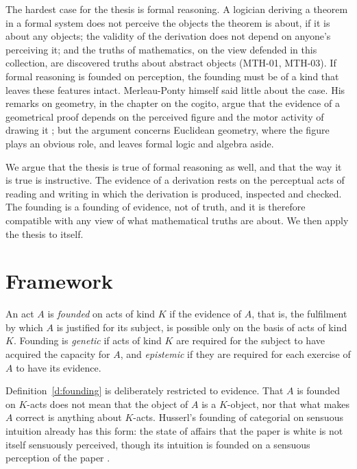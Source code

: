\documentclass{situationist-preprint}
\begin{document}
The hardest case for the thesis is formal reasoning. A logician deriving a theorem in a formal system does not perceive the objects the theorem is about, if it is about any objects; the validity of the derivation does not depend on anyone's perceiving it; and the truths of mathematics, on the view defended in this collection, are discovered truths about abstract objects (MTH-01, MTH-03). If formal reasoning is founded on perception, the founding must be of a kind that leaves these features intact. Merleau-Ponty himself said little about the case. His remarks on geometry, in the chapter on the cogito, argue that the evidence of a geometrical proof depends on the perceived figure and the motor activity of drawing it \citep[III.1]{MerleauPonty1945}; but the argument concerns Euclidean geometry, where the figure plays an obvious role, and leaves formal logic and algebra aside.

We argue that the thesis is true of formal reasoning as well, and that the way it is true is instructive. The evidence of a derivation rests on the perceptual acts of reading and writing in which the derivation is produced, inspected and checked. The founding is a founding of evidence, not of truth, and it is therefore compatible with any view of what mathematical truths are about. We then apply the thesis to itself.

\section{Framework}

\begin{definition}\label{d:founding}
An act $A$ is \emph{founded} on acts of kind $K$ if the evidence of $A$, that is, the fulfilment by which $A$ is justified for its subject, is possible only on the basis of acts of kind $K$. Founding is \emph{genetic} if acts of kind $K$ are required for the subject to have acquired the capacity for $A$, and \emph{epistemic} if they are required for each exercise of $A$ to have its evidence.
\end{definition}

Definition~\ref{d:founding} is deliberately restricted to evidence. That $A$ is founded on $K$-acts does not mean that the object of $A$ is a $K$-object, nor that what makes $A$ correct is anything about $K$-acts. Husserl's founding of categorial on sensuous intuition already has this form: the state of affairs that the paper is white is not itself sensuously perceived, though its intuition is founded on a sensuous perception of the paper \citep[VI, §48]{Husserl1901}.
\end{document}
